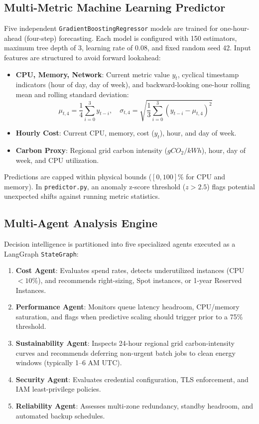 \documentclass[conference]{IEEEtran}
\begin{document}
\subsection{Multi-Metric Machine Learning Predictor}
Five independent \texttt{GradientBoostingRegressor} models are trained for one-hour-ahead (four-step) forecasting. Each model is configured with 150 estimators, maximum tree depth of 3, learning rate of 0.08, and fixed random seed 42. Input features are structured to avoid forward lookahead:
\begin{itemize}
    \item \textbf{CPU, Memory, Network}: Current metric value $y_t$, cyclical timestamp indicators (hour of day, day of week), and backward-looking one-hour rolling mean and rolling standard deviation:
    \begin{equation}
        \mu_{t, 4} = \frac{1}{4} \sum_{i=0}^3 y_{t-i}, \quad \sigma_{t, 4} = \sqrt{\frac{1}{3} \sum_{i=0}^3 (y_{t-i} - \mu_{t, 4})^2}
    \end{equation}
    \item \textbf{Hourly Cost}: Current CPU, memory, cost ($y_t$), hour, and day of week.
    \item \textbf{Carbon Proxy}: Regional grid carbon intensity ($gCO_2/kWh$), hour, day of week, and CPU utilization.
\end{itemize}
Predictions are capped within physical bounds ($[0, 100]\%$ for CPU and memory). In \texttt{predictor.py}, an anomaly z-score threshold ($z > 2.5$) flags potential unexpected shifts against running metric statistics.

\subsection{Multi-Agent Analysis Engine}
Decision intelligence is partitioned into five specialized agents executed as a LangGraph \texttt{StateGraph}:
\begin{enumerate}
    \item \textbf{Cost Agent}: Evaluates spend rates, detects underutilized instances (CPU $< 10\%$), and recommends right-sizing, Spot instances, or 1-year Reserved Instances.
    \item \textbf{Performance Agent}: Monitors queue latency headroom, CPU/memory saturation, and flags when predictive scaling should trigger prior to a 75\% threshold.
    \item \textbf{Sustainability Agent}: Inspects 24-hour regional grid carbon-intensity curves and recommends deferring non-urgent batch jobs to clean energy windows (typically 1--6 AM UTC).
    \item \textbf{Security Agent}: Evaluates credential configuration, TLS enforcement, and IAM least-privilege policies.
    \item \textbf{Reliability Agent}: Assesses multi-zone redundancy, standby headroom, and automated backup schedules.
\end{enumerate}
\end{document}

